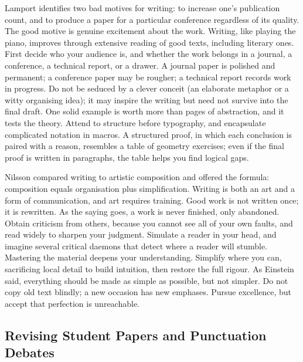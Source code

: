 \documentclass[11pt]{article}
\begin{document}
Lamport identifies two bad motives for writing: to increase one's publication count, and to produce a paper for a particular conference regardless of its quality. The good motive is genuine excitement about the work. Writing, like playing the piano, improves through extensive reading of good texts, including literary ones. First decide who your audience is, and whether the work belongs in a journal, a conference, a technical report, or a drawer. A journal paper is polished and permanent; a conference paper may be rougher; a technical report records work in progress. Do not be seduced by a clever conceit (an elaborate metaphor or a witty organising idea); it may inspire the writing but need not survive into the final draft. One solid example is worth more than pages of abstraction, and it tests the theory. Attend to structure before typography, and encapsulate complicated notation in macros. A structured proof, in which each conclusion is paired with a reason, resembles a table of geometry exercises; even if the final proof is written in paragraphs, the table helps you find logical gaps.

Nilsson compared writing to artistic composition and offered the formula: composition equals organisation plus simplification. Writing is both an art and a form of communication, and art requires training. Good work is not written once; it is rewritten. As the saying goes, a work is never finished, only abandoned. Obtain criticism from others, because you cannot see all of your own faults, and read widely to sharpen your judgment. Simulate a reader in your head, and imagine several critical daemons that detect where a reader will stumble. Mastering the material deepens your understanding. Simplify where you can, sacrificing local detail to build intuition, then restore the full rigour. As Einstein said, everything should be made as simple as possible, but not simpler. Do not copy old text blindly; a new occasion has new emphases. Pursue excellence, but accept that perfection is unreachable.

\subsection{Revising Student Papers and Punctuation Debates}
\end{document}
